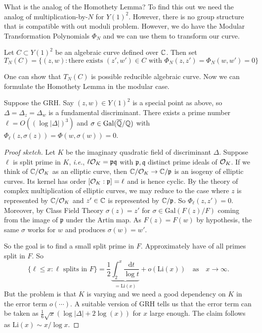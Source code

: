What is the analog of the Homothety Lemma? To find this out we need
the analog of multiplication-by-$N$ for $Y(1)^2$. However, there is
no group structure that is compatible with out moduli problem.
However, we do have the Modular Transformation Polynomials $\Phi_N$
and we can use them to transform our curve.

\begin{definition}
  Let $C\subset Y(1)^2$ be an algebraic curve defined over ${\mathbb{C}}$. Then set
  \begin{equation*}
    T_N(C) = \{(z,w) : \text{there exists $(z',w')\in C$ with $\Phi_N(z,z')=\Phi_N(w,w')=0$}\}
  \end{equation*}  
\end{definition}

One can show that $T_N(C)$ is possible reducible algebraic curve.
Now we can formulate the Homothety Lemma in the modular case.

\begin{lemma}
  Suppose the GRH.
  Say $(z,w)\in Y(1)^2$ is a special point as above, so %
 $\Delta=\Delta_z=\Delta_w$ is a fundamental discriminant.
  There exists a prime number $\ell=O((\log
  |\Delta|)^3)$ and $\sigma\in \mathrm{Gal}({\overline{\mathbb{Q}}}/{\mathbb{Q}})$  with $\Phi_\ell(z,\sigma(z))=\Phi(w,\sigma(w))=0$. 
\end{lemma}
\begin{proof}[Proof sketch]
  Let $K$ be the imaginary quadratic field of discriminant $\Delta$.
  Suppose $\ell$ is split prime in $K$, \textit{i.e.}, $\ell{\mathcal O}_K =
  \mathfrak{p}\mathfrak{q}$ with $  \mathfrak{p},\mathfrak{q}$
  distinct prime ideals of ${\mathcal O}_K$.
  If we think of ${\mathbb{C}}/{\mathcal O}_K$ as an elliptic curve,
  then ${\mathbb{C}}/{\mathcal O}_K \rightarrow {\mathbb{C}}/\mathfrak{p}$ is an isogeny of
  elliptic curves. Its kernel has order $[{\mathcal O}_K:\mathfrak{p}]=\ell$
  and is hence cyclic. By the theory of complex multiplication of
  elliptic curves, we may reduce to the case where $z$ is
  represented by ${\mathbb{C}}/{\mathcal O}_K$ and $z'\in {\mathbb{C}}$ is represented by
  ${\mathbb{C}}/\mathfrak{p}$. So $\Phi_{\ell}(z,z')=0$. 
  Moreover, by Class Field Theory $\sigma(z)=z'$ for $\sigma \in
  \mathrm{Gal}(F(z)/F)$ coming from the image of $\mathfrak{p}$ under
  the Artin map. As $F(z)=F(w)$ by hypothesis, the same $\sigma$ works
  for $w$ and produces $\sigma(w)=w'$.

  So the goal is to find a small split prime in $F$. Approximately
  have of all primes split in $F$. So
  \begin{equation*}
    \{\ell \le x : \ell \text{ splits in }F\} = \frac 12 \underbrace{\int_2^x
      \frac{\mathrm{d} t}{\log t}}_{=\mathrm{Li}(x)} + o(\mathrm{Li}(x))
    \quad\text{as}\quad x\rightarrow\infty. 
  \end{equation*}
  But the problem is that $K$ is
  varying and we need a good dependency on $K$ in the error term
  $o(\cdots)$.
  A suitable version of GRH tells us that the error term can be taken
  as
  $\frac 16 \sqrt x (\log|\Delta| + 2\log(x))$ for $x$ large enough.
  The claim follows as $\mathrm{Li}(x)\sim x/\log x$. 
\end{proof}

